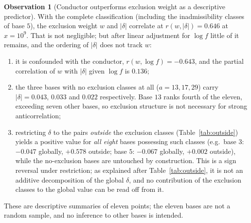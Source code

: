 \documentclass[11pt,reqno]{amsart}
\theoremstyle{plain}
\theoremstyle{definition}
\newtheorem{observation}[theorem]{Observation}
\begin{document}
\begin{observation}[Conductor outperforms exclusion weight as a descriptive predictor]
\label{obs:refutation}
With the complete classification (including the inadmissibility classes of
base $5$), the exclusion weight $w$ and $|\delta|$ correlate at
$r(w, |\delta|) = 0.646$ at $x = 10^9$. That is not negligible; but after
linear adjustment for $\log f$ little of it remains, and the ordering of
$|\delta|$ does not track $w$:
\begin{enumerate}
\item it is confounded with the conductor, $r(w, \log f) = -0.643$, and the
      partial correlation of $w$ with $|\delta|$ given $\log f$ is $0.136$;
\item the three bases with no exclusion classes at all ($a = 13, 17, 29$)
      carry $|\delta| = 0.043$, $0.033$ and $0.022$ respectively. Base $13$
      ranks fourth of the eleven, exceeding seven other bases, so exclusion
      structure is not necessary for strong anticorrelation;
\item restricting $\delta$ to the pairs \emph{outside} the exclusion classes
      (Table~\ref{tab:outside}) yields a positive value for \emph{all eight}
      bases possessing such classes (e.g.\ base $3$: $-0.047$ globally,
      $+0.578$ outside; base $5$: $-0.067$ globally, $+0.002$ outside), while
      the no-exclusion bases are untouched by construction. This is a sign
      reversal under restriction; as explained after
      Table~\ref{tab:outside}, it is not an additive decomposition of the
      global $\delta$, and no contribution of the exclusion classes to the
      global value can be read off from it.
\end{enumerate}
These are descriptive summaries of eleven points; the eleven bases are not a
random sample, and no inference to other bases is intended.
\end{observation}
\end{document}
